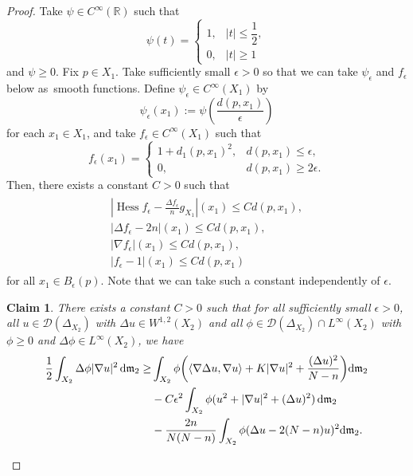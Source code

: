 \documentclass[pdftex]{sigma}
\numberwithin{equation}{section}
\newtheorem{Clm}[Thm]{Claim}
\theoremstyle{definition}
\newcommand{\Hess}{\operatorname{Hess}}
\newcommand{\R}{\mathbb{R}}
\newcommand{\mf}{\mathfrak{m}}
\newcommand{\D}{\mathcal{D}}
\begin{document}
\begin{proof}
Take $\psi\in C^\infty(\R)$ such that
\[
\psi(t)=
\begin{cases}
1,& |t|\leq \dfrac{1}{2},
\\
0,& |t|\geq 1
\end{cases}
\]
and $\psi\geq 0$.
Fix $p\in X_1$.
Take sufficiently small $\epsilon>0$ so that we can take $\psi_\epsilon$ and $f_\epsilon$ below as~smooth functions.
Define $\psi_\epsilon \in C^\infty(X_1)$ by
\[
\psi_\epsilon (x_1):=\psi\left(\frac{d(p,x_1)}{\epsilon}\right)
\]
for each $x_1\in X_1$, and take $f_\epsilon\in C^\infty(X_1)$ such that
\[
f_\epsilon (x_1)=
\begin{cases}
1+d_1(p,x_1)^2,& d(p,x_1) \leq \epsilon,
\\
0,& d(p,x_1)\geq 2\epsilon.
\end{cases}
\]
Then, there exists a constant $C>0$ such that
\begin{gather}\label{hessf}
\begin{array}{l}
\left|\Hess f_\epsilon-\frac{\Delta f_\epsilon}{n}g_{X_1}\right|(x_1)\leq C d(p,x_1),
\\[1ex]
|\Delta f_\epsilon -2n|(x_1)\leq C d(p,x_1),
\\
|\nabla f_\epsilon|(x_1)\leq C d(p,x_1),
\\[1ex]
|f_\epsilon-1|(x_1)\leq C d(p,x_1)
\end{array}
\end{gather}
for all $x_1\in B_\epsilon(p)$.
Note that we can take such a constant independently of $\epsilon$.

\begin{Clm}\label{eper}
There exists a constant $C>0$ such that for all sufficiently small $\epsilon>0$, all $u\in\D(\Delta_{X_2})$ with $\Delta u\in W^{1,2}(X_2)$ and all $\phi\in\D(\Delta_{X_2})\cap L^\infty(X_2)$ with $\phi\geq0$ and $\Delta \phi\in L^\infty(X_2)$, we have
\begin{align*}
\frac{1}{2}\int_{X_2}\Delta \phi|\nabla u|^2 \,{\rm d}\mf_2
\geq &\int_{X_2} \phi\bigg(\langle\nabla \Delta u,\nabla u\rangle+K|\nabla u|^2+\frac{(\Delta u)^2}{N-n}\bigg){\rm d}\mf_2
\\
&{}-C\epsilon^2\int_{X_2} \phi (u^2+|\nabla u|^2+(\Delta u)^2)\,{\rm d}\mf_2
\\
&{}-\frac{2n}{N(N-n)}\int_{X_2}\phi(\Delta u-2(N-n)u)^2{\rm d}\mf_2.
\end{align*}
\end{Clm}


\end{proof}
\end{document}
